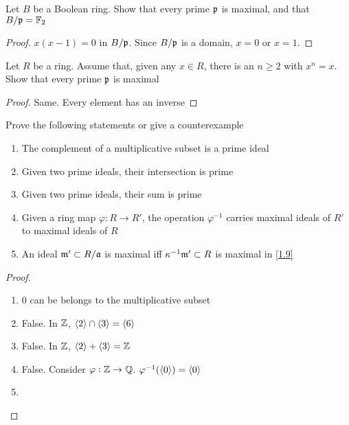 \documentclass[11pt]{article}
\begin{document}
\begin{exercise}
\label{2.36}
Let \(B\) be a Boolean ring. Show that every prime \(\mathfrak{p}\) is maximal, and
that \(B/\mathfrak{p}=\mathbb{F}_2\)
\end{exercise}

\begin{proof}
\(x(x-1)=0\) in \(B/\mathfrak{p}\). Since \(B/\mathfrak{p}\) is a domain, \(x=0\) or \(x=1\).
\end{proof}

\begin{exercise}
\label{2.37}
Let \(R\) be a ring. Assume that, given any \(x\in R\), there is an
\(n\ge2\) with \(x^n=x\). Show that every prime \(\mathfrak{p}\) is maximal
\end{exercise}

\begin{proof}
Same. Every element has an inverse
\end{proof}

\begin{exercise}
\label{2.38}
Prove the following statements or give a counterexample
\begin{enumerate}
\item The complement of a multiplicative subset is a prime ideal
\item Given two prime ideals, their intersection is prime
\item Given two prime ideals, their sum is prime
\item Given a ring map \(\varphi:R\to R'\), the operation \(\varphi^{-1}\) carries maximal
ideals of \(R'\) to maximal ideals of \(R\)
\item An ideal \(\mathfrak{m}'\subset R/\mathfrak{a}\) is maximal iff \(\kappa^{-1}\mathfrak{m}'\subset R\) is
maximal in \ref{1.9}
\end{enumerate}
\end{exercise}

\begin{proof}
\begin{enumerate}
\item 0 can be belongs to the multiplicative subset
\item False. In \(\mathbb{Z}\), \(\langle2\rangle\cap\langle3\rangle=\langle6\rangle\)
\item False. In \(\mathbb{Z}\), \(\langle2\rangle+\langle3\rangle=\mathbb{Z}\)
\item False. Consider \(\varphi:\mathbb{Z}\to\mathbb{Q}\). \(\varphi^{-1}(\langle0\rangle)=\langle0\rangle\)
\item 
\end{enumerate}
\end{proof}
\end{document}
